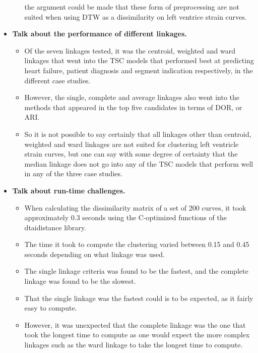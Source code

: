 \begin{itemize}
\begin{itemize}
              the argument could be made that these form of preprocessing are not suited when using DTW as a dissimilarity on left ventrice strain curves.
    \end{itemize}
    \item \textbf{Talk about the performance of different linkages.}
    \begin{itemize}
        \item Of the seven linkages tested, it was the centroid, weighted and ward linkages that went into the TSC models 
              that performed best at predicting heart failure, patient diagnosis and segment indication respectively, in the different case studies. 
        \item However, the single, complete and average linkages also went into the methods that appeared in the top five candidates in terms of DOR, or ARI.
        \item So it is not possible to say certainly that all linkages other than centroid, weighted and ward linkages are not suited for clustering left ventricle strain curves,
              but one can say with some degree of certainty that the median linkage does not go into any of the TSC models that perform well in any of the three case studies. 
    \end{itemize}
    \item \textbf{Talk about run-time challenges.}
    \begin{itemize}
        \item When calculating the dissimilarity matrix of a set of 200 curves, it took approximately 0.3 seconds using the C-optimized functions of the dtaidistance library.
        \item The time it took to compute the clustering varied between 0.15 and 0.45 seconds depending on what linkage was used. 
        \item The single linkage criteria was found to be the fastest, and the complete linkage was found to be the slowest. 
        \item That the single linkage was the fastest could is to be expected, as it fairly easy to compute. 
        \item However, it was unexpected that the complete linkage was the one that took the longest time to compute as one would expect the more complex linkages such as the ward linkage
              to take the longest time to compute.
    \end{itemize}

\end{itemize}

